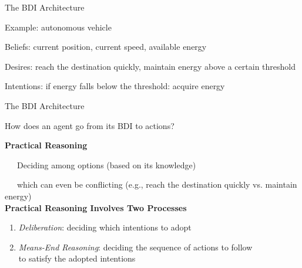 \documentclass[compress]{beamer}
\begin{document}
\begin{frame}{The BDI Architecture}

\footnotesize

\begin{block}{{\scriptsize Example: autonomous vehicle}}
\scriptsize

Beliefs: current position, current speed, available energy\\ \vspace{.2cm}

Desires: reach the destination quickly, maintain energy above a certain threshold \\ \vspace{.2cm}

Intentions: if energy falls below the threshold: acquire energy\\ \vspace{.2cm}

\end{block}



\end{frame}



\begin{frame}{The BDI Architecture}

How does an agent go from its BDI to actions?\\ \vspace{.5cm}

{\bf Practical Reasoning}\\

\vspace{-.2cm}

\ \ \ Deciding among options {\tiny (based on its knowledge)}\\

\vspace{-.5cm}

\ \ \ {\footnotesize which can even be conflicting} {\tiny (e.g., reach the destination quickly vs. maintain energy)}\\


{\bf Practical Reasoning Involves Two Processes}\\ \vspace{-.2cm}
\begin{enumerate}\footnotesize
 \item \textit{Deliberation}: deciding which intentions to adopt \vspace{.2cm}
 \item \textit{Means-End Reasoning}: deciding the sequence of actions to follow\\ 
 to satisfy the adopted intentions
\end{enumerate}

\end{frame}
\end{document}
